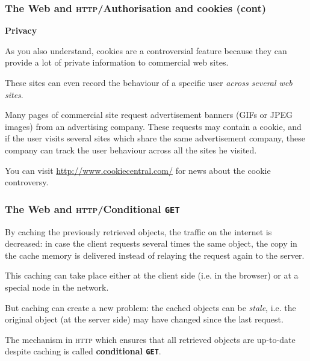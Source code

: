 %
\begin{frame}
\frametitle{The Web and \textsc{http}/Authorisation and cookies (cont)}

\textbf{Privacy}

As you also understand, cookies are a controversial feature because
they can provide a lot of private information to commercial web sites.

\bigskip

These sites can even record the behaviour of a specific user
\emph{across several web sites}.

\bigskip

Many pages of commercial site request advertisement banners (GIFs or
JPEG images) from an advertising company. These requests may contain a
cookie, and if the user visits several sites which share the same
advertisement company, these company can track the user behaviour
across all the sites he visited.

\bigskip

You can visit \url{http://www.cookiecentral.com/} for news about the
cookie controversy.

\end{frame}

%
\begin{frame}
\frametitle{The Web and \textsc{http}/Conditional \texttt{GET}}

By caching the previously retrieved objects, the traffic on the
internet is decreased: in case the client requests several times the
same object, the copy in the cache memory is delivered instead of
relaying the request again to the server.

\bigskip

This caching can take place either at the client side (i.e. in the
browser) or at a special node in the network.

\bigskip

But caching can create a new problem: the cached objects can be
\emph{stale}, i.e. the original object (at the server side) may have
changed since the last request.

\bigskip

The mechanism in \textsc{http} which ensures that all retrieved
objects are up-to-date despite caching is called \textbf{conditional
  \texttt{GET}}.

\end{frame}

